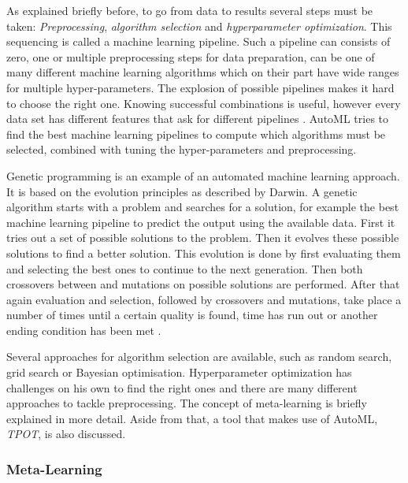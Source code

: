 \documentclass[10pt,a4paper]{report}
\begin{document}
	As explained briefly before, to go from data to results several steps must be taken: \textit{Preprocessing}, \textit{algorithm selection} and \textit{hyperparameter optimization}. This sequencing is called a machine learning pipeline. Such a pipeline can consists of zero, one or multiple preprocessing steps for data preparation, can be one of many different machine learning algorithms which on their part have wide ranges for multiple hyper-parameters. The explosion of possible pipelines makes it hard to choose the right one. Knowing successful combinations is useful, however every data set has different features that ask for different pipelines \cite{Gijsbers2017Thesis}. AutoML tries to find the best machine learning pipelines to compute which algorithms must be selected, combined with tuning the hyper-parameters and preprocessing. 
	
	Genetic programming is an example of an automated machine learning approach. It is based on the evolution principles as described by Darwin. A genetic algorithm starts with a problem and searches for a solution, for example the best machine learning pipeline to predict the output using the available data. First it tries out a set of possible solutions to the problem. Then it evolves these possible solutions to find a better solution. This evolution is done by first evaluating them and selecting the best ones to continue to the next generation. Then both crossovers between and mutations on possible solutions are performed. After that again evaluation and selection, followed by crossovers and mutations, take place a number of times until a certain quality is found, time has run out or another ending condition has been met \cite{koza1997genetic}.
	
	Several approaches for algorithm selection are available, such as random search, grid search or Bayesian optimisation. Hyperparameter optimization has challenges on his own to find the right ones and there are many different approaches to tackle preprocessing. The concept of meta-learning is briefly explained in more detail. Aside from that, a tool that makes use of AutoML, \textit{TPOT}, is also discussed. 	
	
	\subsubsection{Meta-Learning}
	\label{FSsubsec:Meta-Learning}
	
\end{document}
